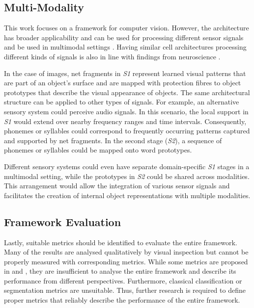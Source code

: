 \subsection{Multi-Modality}
This work focuses on a framework for computer vision. However, the architecture has broader applicability and can be used for processing different sensor signals and be used in multimodal settings .
Having similar cell architectures processing different kinds of signals is also in line with findings from neuroscience .

In the case of images, net fragments in \emph{S1} represent learned visual patterns that are part of an object's surface and are mapped with protection fibres to object prototypes that describe the visual appearance of objects. 
The same architectural structure can be applied to other types of signals. For example, an alternative sensory system could perceive audio signals. In this scenario, the local support in \emph{S1} would extend over nearby frequency ranges and time intervals. Consequently, phonemes or syllables could correspond to frequently occurring patterns captured and supported by net fragments. In the second stage (\emph{S2}), a sequence of phonemes or syllables could be mapped onto word prototypes.

Different sensory systems could even have separate domain-specific \emph{S1} stages in a multimodal setting, while the prototypes in \emph{S2} could be shared across modalities. This arrangement would allow the integration of various sensor signals and facilitates the creation of internal object representations with multiple modalities.


\subsection{Framework Evaluation}
Lastly, suitable metrics should be identified to evaluate the entire framework. Many of the results are analysed qualitatively by visual inspection but cannot be properly measured with corresponding metrics.
While some metrics are proposed in  and , they are insufficient to analyse the entire framework and describe its performance from different perspectives.
Furthermore, classical classification or segmentation metrics are unsuitable.
Thus, further research is required to define proper metrics that reliably describe the performance of the entire framework.






